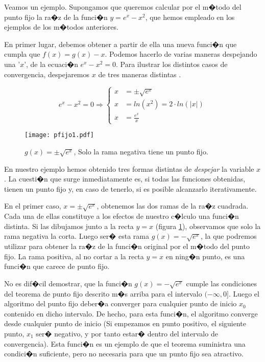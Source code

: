 Veamos un ejemplo. Supongamos  que queremos calcular por el m�todo del punto fijo la ra�z de la  
funci�n $y=e^x-x^2$, que hemos empleado en los ejemplos de los m�todos anteriores.

En primer lugar, debemos obtener a partir de ella una nueva funci�n que cumpla que $f(x)=g(x)-x$. Podemos hacerlo de varias maneras despejando una '$x$', de la ecuaci�n $e^x-x^2=0$.  Para ilustrar los distintos casos de convergencia, despejaremos $x$ de tres maneras distintas .

\begin{equation*}
e^x-x^2=0 \Rightarrow \left\{
\begin{aligned}
x&=\pm  \sqrt{e^x}\\
x&= ln(x^2)=2\cdot ln(\vert x \vert)\\
x&=\frac{e^x}{x} 
\end{aligned} 
\right.
\end{equation*}

\begin{figure}[h]
\texttt{[image: pfijo1.pdf]}
\caption{$g(x)=\pm \sqrt{e^x}$, Solo la rama negativa tiene un punto fijo.}
\label{fig:pfijo01}
\end{figure}

En nuestro ejemplo hemos obtenido tres formas distintas de \emph{despejar} la variable $x$. La cuesti�n que surge inmediatamente es, si todas las funciones obtenidas, tienen un punto fijo y, en caso de tenerlo, si es posible alcanzarlo iterativamente.

En el primer caso, $x=\pm \sqrt{e^x}$, obtenemos las dos ramas de la ra�z cuadrada. Cada una de ellas constituye a los efectos de nuestro c�lculo una funci�n distinta. Si las dibujamos junto a la recta $y=x$ (figura \ref{fig:pfijo01}), observamos que solo la rama negativa la corta. Luego ser�  esta rama $g(x)=-\sqrt{e^x}$,  la que podremos utilizar para obtener la ra�z de la funci�n original por el m�todo del punto fijo. La rama positiva, al no cortar a la recta $y=x$ en ning�n punto, es una funci�n que carece de punto fijo.

No es dif�cil demostrar, que la funci�n $g(x)=-\sqrt{e^x} $ cumple las condiciones del teorema de punto fijo descrito m�s arriba para el intervalo $(-\infty, 0]$. Luego el algoritmo del punto fijo deber�a converger para cualquier punto de inicio $x_0$ contenido en dicho intervalo. De hecho, para esta funci�n, el algoritmo converge desde cualquier punto de inicio (Si empezamos en punto positivo, el siguiente punto, $x_1$ ser� negativo, y por tanto estar� dentro del intervalo de convergencia). Esta funci�n es un ejemplo de que el teorema suministra una condici�n suficiente, pero no necesaria para que un punto fijo sea atractivo. 

